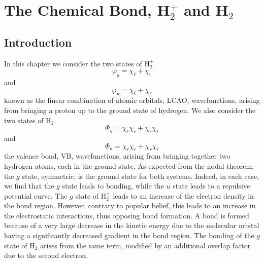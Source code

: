 \chapter{The Chemical Bond, H$_2^+$ and H$_2$}

\section{Introduction}

In this chapter we consider the two states of H$^+_2$
\begin{equation}
\varphi_g = \chi_{\ell} + \chi_r
\end{equation}
and
\begin{equation}
\varphi_u = \chi_{\ell} + \chi_r
\end{equation}
known as the linear combination of atomic orbitals, LCAO, 
wavefunctions, arising from bringing a proton up to the ground state 
of hydrogen. We also consider the two states of H$_2$
\begin{equation}
\Phi_g = \chi_{\ell} \chi_r + \chi_r \chi_{\ell}
\end{equation}
and
\begin{equation}
\Phi_u = \chi_{\ell} \chi_r + \chi_r \chi_{\ell}
\end{equation}
the valence bond, VB, wavefunctions, arising from bringing together 
two hydrogen atoms, each in the ground state. As expected from the nodal 
theorem, the $g$ state, symmetric, is the ground state for both 
systems. Indeed, in each case, we find that the $g$ state leads to
bonding, while the $u$ state leads to a repulsive potential curve.  
The $g$ state of H$^+_2$ leads to an increase of the electron density 
in the bond region. However, contrary to popular belief, this leads to an 
increase in the electrostatic interactions, thus opposing bond
formation. A bond is formed because of a very large decrease in the 
kinetic energy due to the molecular orbital having a significantly 
decreased gradient in the bond region. The bonding of the $g$ state of 
H$_2$ arises from the same term, modified
by an additional overlap factor due to the second electron.

